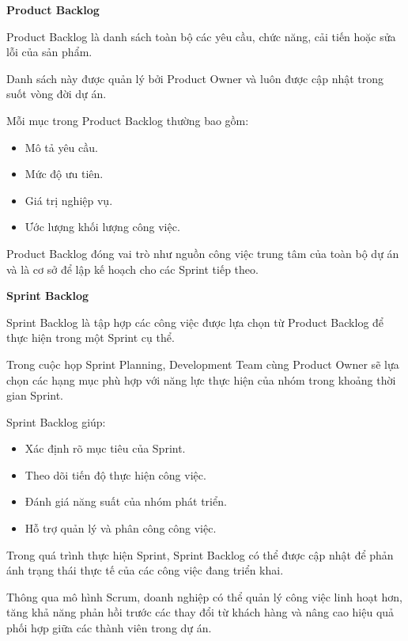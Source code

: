 \textbf{Product Backlog}

\hspace{0.2cm}Product Backlog là danh sách toàn bộ các yêu cầu, chức năng, cải tiến hoặc sửa lỗi của sản phẩm.

\hspace{0.2cm}Danh sách này được quản lý bởi Product Owner và luôn được cập nhật trong suốt vòng đời dự án.

\hspace{0.2cm}Mỗi mục trong Product Backlog thường bao gồm:

\begin{itemize}
\item Mô tả yêu cầu.
\item Mức độ ưu tiên.
\item Giá trị nghiệp vụ.
\item Ước lượng khối lượng công việc.
\end{itemize}

Product Backlog đóng vai trò như nguồn công việc trung tâm của toàn bộ dự án và là cơ sở để lập kế hoạch cho các Sprint tiếp theo.


\textbf{Sprint Backlog}

\hspace{0.2cm}Sprint Backlog là tập hợp các công việc được lựa chọn từ Product Backlog để thực hiện trong một Sprint cụ thể.

\hspace{0.2cm}Trong cuộc họp Sprint Planning, Development Team cùng Product Owner sẽ lựa chọn các hạng mục phù hợp với năng lực thực hiện của nhóm trong khoảng thời gian Sprint.

\hspace{0.2cm}Sprint Backlog giúp:

\begin{itemize}
\item Xác định rõ mục tiêu của Sprint.
\item Theo dõi tiến độ thực hiện công việc.
\item Đánh giá năng suất của nhóm phát triển.
\item Hỗ trợ quản lý và phân công công việc.
\end{itemize}

\hspace{0.2cm}Trong quá trình thực hiện Sprint, Sprint Backlog có thể được cập nhật để phản ánh trạng thái thực tế của các công việc đang triển khai.

\hspace{0.2cm}Thông qua mô hình Scrum, doanh nghiệp có thể quản lý công việc linh hoạt hơn, tăng khả năng phản hồi trước các thay đổi từ khách hàng và nâng cao hiệu quả phối hợp giữa các thành viên trong dự án.


